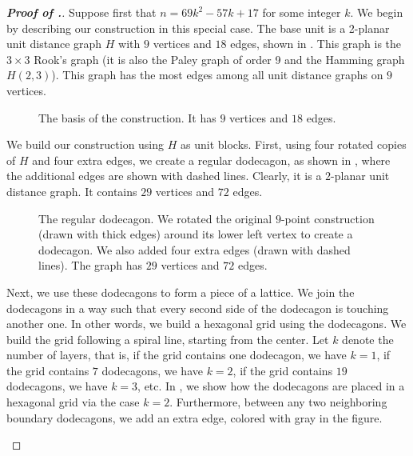 \documentclass[10pt,a4paper]{amsart}
\begin{document}
\begin{proof}[\bf Proof of .]

Suppose first that $n=69k^2-57k+17$ for some integer $k$. We begin by describing our construction in this special case.
The base unit is a 2-planar unit distance graph $H$ with $9$ vertices and $18$ edges, shown in . This graph is the $3\times 3$ Rook's graph (it is also the Paley graph of order 9 and the Hamming graph $H(2,3)$).
This graph has the most edges among all unit distance graphs on $9$ vertices.

    \begin{figure}[ht!]
    \centering
        
        \caption{The basis of the construction. It has $9$ vertices and $18$ edges.}
        \label{n=9}
    \end{figure}   
    
We build our construction using $H$ as unit blocks. First, using four rotated copies of $H$ and four extra edges, we create a regular dodecagon, as shown in , where the additional edges are shown with dashed lines. Clearly, it is a $2$-planar unit distance graph. It contains $29$ vertices and $72$ edges.


       \begin{figure}[ht!]
      \centering
        
        \caption{The regular dodecagon. We rotated the original $9$-point construction (drawn with thick edges) around its lower left vertex to create a dodecagon. We also added four extra edges (drawn with dashed lines). The graph has $29$ vertices and $72$ edges.}
        \label{n=29}
    \end{figure}
    
Next, we use these dodecagons to form a piece of a lattice. We join the dodecagons in a way such that every second side of the dodecagon is touching another one. In other words, we build a hexagonal grid using the dodecagons. We build the grid following a spiral line, starting from the center. 
Let $k$ denote the number of layers, that is, if the grid contains one dodecagon, we have $k=1$, if the grid contains $7$ dodecagons, we have $k=2$, if the grid contains $19$ dodecagons, we have $k=3$, etc. In , we show how the dodecagons are placed in a hexagonal grid via the case $k=2$. Furthermore, between any two neighboring boundary dodecagons, we add an extra edge, colored with gray in the figure.
    
    
       \begin{figure}[ht!]
        \centering
        

\end{figure}
\end{proof}
\end{document}
